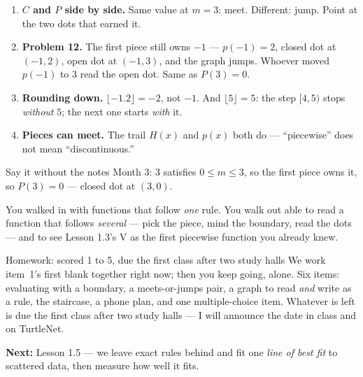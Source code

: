 \documentclass[aspectratio=169, 11pt]{beamer}
\begin{document}
\begin{frame}[t, plain]
  \begin{enumerate}\setlength{\itemsep}{5pt}
    \item \textbf{$C$ and $P$ side by side.} Same value at $m=3$: meet. Different: jump. Point at
          the two dots that earned it.
    \item \textbf{Problem 12.} The first piece still owns $-1$ --- $p(-1)=2$, closed dot at
          $(-1,2)$, open dot at $(-1,3)$, and the graph jumps. Whoever moved $p(-1)$ to $3$ read
          the open dot. Same as $P(3)=0$.
    \item \textbf{Rounding down.} $\lfloor-1.2\rfloor=-2$, not $-1$. And $\lfloor5\rfloor=5$:
          the step $[4,5)$ stops \emph{without} $5$; the next one starts \emph{with} it.
    \item \textbf{Pieces can meet.} The trail $H(x)$ and $p(x)$ both do --- ``piecewise'' does not
          mean ``discontinuous.''
  \end{enumerate}
  \vspace{4pt}
  \begin{block}{Say it without the notes}
    Month 3: $3$ satisfies $0\le m\le3$, so the first piece owns it, so $P(3)=0$ --- closed dot at
    $(3,0)$.
  \end{block}
\end{frame}

\begin{frame}[t, plain]
  You walked in with functions that follow \emph{one} rule. You walk out able to read a function
  that follows \emph{several} --- pick the piece, mind the boundary, read the dots --- and to see
  Lesson 1.3's V as the first piecewise function you already knew.
  \vspace{5pt}
  \begin{block}{Homework: scored 1 to 5, due the first class after two study halls}
    We work item~1's first blank together right now; then you keep going, alone. Six items:
    evaluating with a boundary, a meets-or-jumps pair, a graph to read \emph{and} write as a rule,
    the staircase, a phone plan, and one multiple-choice item. Whatever is left is due the first
    class after two study halls --- I will announce the date in class and on TurtleNet.
  \end{block}
  \vspace{4pt}
  \textbf{Next:} Lesson 1.5 --- we leave exact rules behind and fit one \emph{line of best fit} to
  scattered data, then measure how well it fits.
\end{frame}
\end{document}
